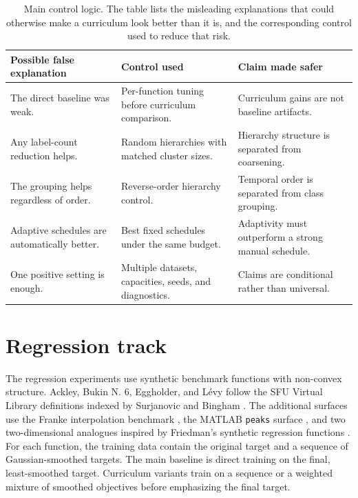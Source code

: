 \documentclass[english,master,a4paper,oneside]{ppfcmthesis}
\begin{document}
\begin{table}[htbp]
\centering
\small
\begin{tabular}{p{}p{}p{}}
\toprule
Possible false explanation & Control used & Claim made safer \\
\midrule
The direct baseline was weak. & Per-function tuning before curriculum comparison. & Curriculum gains are not baseline artifacts. \\
Any label-count reduction helps. & Random hierarchies with matched cluster sizes. & Hierarchy structure is separated from coarsening. \\
The grouping helps regardless of order. & Reverse-order hierarchy control. & Temporal order is separated from class grouping. \\
Adaptive schedules are automatically better. & Best fixed schedules under the same budget. & Adaptivity must outperform a strong manual schedule. \\
One positive setting is enough. & Multiple datasets, capacities, seeds, and diagnostics. & Claims are conditional rather than universal. \\
\bottomrule
\end{tabular}
\caption{Main control logic. The table lists the misleading explanations that
could otherwise make a curriculum look better than it is, and the corresponding
control used to reduce that risk.}
\label{tab:method-control-logic}
\end{table}

\section{Regression track}

The regression experiments use synthetic benchmark functions with non-convex
structure. Ackley, Bukin N. 6, Eggholder, and L\'evy follow the SFU Virtual
Library definitions indexed by Surjanovic and Bingham
\citep{surjanovic2013benchmark}. The additional surfaces use the Franke
interpolation benchmark \citep{franke1979critical}, the MATLAB \texttt{peaks}
surface \citep{mathworksPeaks}, and two two-dimensional analogues inspired by
Friedman's synthetic regression functions \citep{friedman1991mars}. For each
function, the training data contain the original target and a sequence of
Gaussian-smoothed targets. The main baseline is direct training on the final,
least-smoothed target. Curriculum variants train on a sequence or a weighted
mixture of smoothed objectives before emphasizing the final target.
\end{document}
